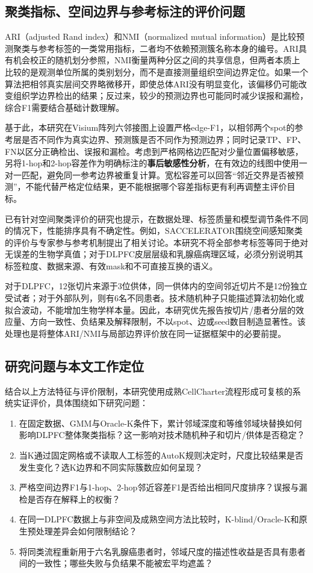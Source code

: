 \subsection{聚类指标、空间边界与参考标注的评价问题}
\label{subsec:cc-evaluation-background-v1}

ARI（adjusted Rand index）和NMI（normalized mutual information）是比较预测聚类与参考标签的一类常用指标，二者均不依赖预测簇名称本身的编号。ARI具有机会校正的随机划分参照，NMI衡量两种分区之间的共享信息，但两者本质上比较的是观测单位所属的类别划分，而不是直接测量组织空间边界定位。如果一个算法把相邻真实层间交界略微移开，即使总体ARI没有明显变化，该偏移仍可能改变组织学边界检出的结果；反过来，较少的预测边界也可能同时减少误报和漏检，综合F1需要结合基础计数理解。

基于此，本研究在Visium阵列六邻接图上设置严格edge-F1，以相邻两个spot的参考层是否不同作为真实边界、预测簇是否不同作为预测边界；同时记录TP、FP、FN以区分正确检出、误报和漏检。考虑到严格网格边匹配对少量位置偏移敏感，另将1-hop和2-hop容差作为明确标注的\textbf{事后敏感性分析}，在有效边的线图中使用一对一匹配，避免同一参考边界被重复计算。宽松容差可以回答“邻近交界是否被预测”，不能代替严格定位结果，更不能根据哪个容差指标更有利再调整主评价目标。

已有针对空间聚类评价的研究也提示，在数据处理、标签质量和模型调节条件不同的情况下，性能排序具有不确定性。例如，SACCELERATOR围绕空间感知聚类的评价与专家参与参考机制提出了相关讨论\cite{sun2026}。本研究不将全部参考标签等同于绝对无误差的生物学真值；对于DLPFC皮层层级和乳腺癌病理区域，必须分别说明其标签粒度、数据来源、有效mask和不可直接互换的语义。

对于DLPFC，12张切片来源于3位供体，同一供体内的空间邻近切片不是12份独立受试者；对于外部队列，则有6名不同患者。技术随机种子只能描述算法初始化或拟合波动，不能增加生物学样本量。因此，本研究优先报告按切片/患者分层的效应量、方向一致性、负结果及解释限制，不以spot、边或seed数目制造显著性。该处理也是将整体ARI/NMI与局部边界评价放在同一证据框架中的必要前提。

\subsection{研究问题与本文工作定位}
\label{subsec:cc-questions-background-v1}

结合以上方法特征与评价限制，本研究使用成熟CellCharter流程形成可复核的系统实证评价，具体围绕如下研究问题：
\begin{enumerate}
  \item 在固定数据、GMM与Oracle-K条件下，累计邻域深度和等维邻域块替换如何影响DLPFC整体聚类指标？这一影响对技术随机种子和切片/供体是否稳定？
  \item 当K通过固定网格或不读取人工标签的AutoK规则决定时，尺度比较结果是否发生变化？选K边界和不同实际簇数应如何呈现？
  \item 严格空间边界F1与1-hop、2-hop邻近容差F1是否给出相同尺度排序？误报与漏检是否存在解释上的权衡？
  \item 在同一DLPFC数据上与非空间及成熟空间方法比较时，K-blind/Oracle-K和原生预处理差异会如何限制结论？
  \item 将同类流程重新用于六名乳腺癌患者时，邻域尺度的描述性收益是否具有患者间的一致性；哪些失败与负结果不能被宏平均遮盖？
\end{enumerate}

